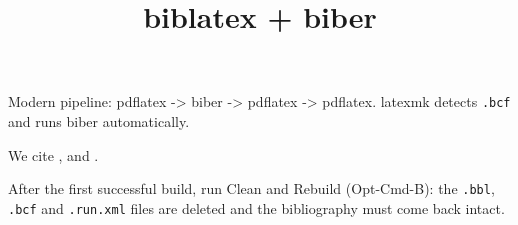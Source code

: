 \documentclass{article}
\title{biblatex + biber}
\begin{document}
\maketitle
Modern pipeline: pdflatex -> biber -> pdflatex -> pdflatex. latexmk detects
\texttt{.bcf} and runs biber automatically.

We cite \textcite{knuth1984}, \parencite{lamport1994} and
\autocite{goossens1994}.

After the first successful build, run Clean and Rebuild (Opt-Cmd-B): the \texttt{.bbl},
\texttt{.bcf} and \texttt{.run.xml} files are deleted and the bibliography must
come back intact.

\printbibliography
\end{document}
